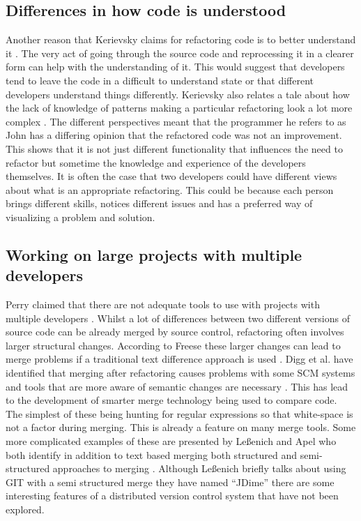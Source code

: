 \documentclass[12pt]{CRPITStyle}
\renewcommand{\cite}{\citep}
\begin{document}
\subsection{Differences in how code is understood}
Another reason that Kerievsky claims for refactoring code is to better understand it \cite{Kerievsky2004}. The very act of going through the source code and reprocessing it in a clearer form can help with the understanding of it. This would suggest that developers tend to leave the code in a difficult to understand state or that different developers understand things differently.
Kerievsky also relates a tale about how the lack of knowledge of patterns making a particular refactoring look a lot more complex \cite{Kerievsky2004}. The different perspectives meant that the programmer he refers to as John has a differing opinion that the refactored code was not an improvement. This shows that it is not just different functionality that influences the need to refactor but sometime the knowledge and experience of the developers themselves. It is often the case that two developers could have different views about what is an appropriate refactoring. This could be because each person brings different skills, notices different issues and has a preferred way of visualizing a problem and solution.

\subsection{Working on large projects with multiple developers}
Perry claimed that there are not adequate tools to use with projects with multiple developers \cite{Perry2001}. Whilst a lot of differences between two different versions of source code can be already merged by source control, refactoring often involves larger structural changes. According to Freese these larger changes can lead to merge problems if a traditional text difference approach is used \cite{freese2007operation}. Digg et al. have identified that merging after refactoring causes problems with some SCM systems and tools that are more aware of semantic changes are necessary \cite{Dig2008}. This has lead to the development of smarter merge technology being used to compare code. The simplest of these being hunting for regular expressions so that white-space is not a factor during merging. This is already a feature on many merge tools. Some more complicated examples of these are presented by Le{\ss}enich and Apel who both identify in addition to text based merging both structured and semi-structured approaches to merging \cite{LeBenich2012} \cite{Apel2011}. Although Le{\ss}enich briefly talks about using GIT with a semi structured merge they have named ``JDime'' there are some interesting features of a distributed version control system that have not been explored.
\end{document}
